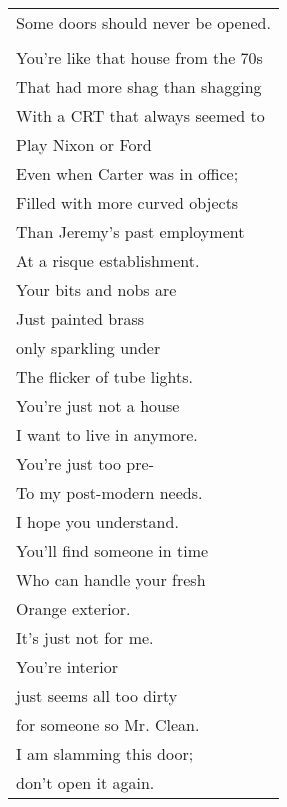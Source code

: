 \documentclass{article}
\begin{document}
\begin{center}
\begin{tabular}{l}
Some doors should never be opened. \\
\\
You're like that house from the 70s \\
That had more shag than shagging \\
With a CRT that always seemed to \\
Play Nixon or Ford \\
Even when Carter was in office; \\ %
Filled with more curved objects \\
Than Jeremy's past employment \\
At a risque establishment. \\
Your bits and nobs are \\
Just painted brass \\
only sparkling under \\
The flicker of tube lights. \\
You're just not a house \\
I want to live in anymore. \\
You're just too pre- \\
To my post-modern needs. \\
I hope you understand. \\
You'll find someone in time \\
Who can handle your fresh \\
Orange exterior. \\
It's just not for me. \\
You're interior \\
just seems all too dirty \\
for someone so Mr. Clean. \\
I am slamming this door; \\
don't open it again. \\
\end{tabular}
\end{center}
\end{document}
